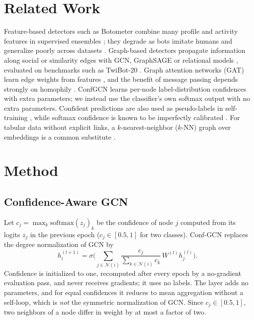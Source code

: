 \documentclass[conference,a4paper]{IEEEtran}
\begin{document}
\section{Related Work}
Feature-based detectors such as Botometer combine many profile and activity features in supervised ensembles \cite{davis2016botornot}; they degrade as bots imitate humans and generalize poorly across datasets \cite{yang2020scalable,lee2021discriminative}. Graph-based detectors propagate information along social or similarity edges with GCN, GraphSAGE \cite{hamilton2017sage} or relational models \cite{feng2021botrgcn,feng2022rgt}, evaluated on benchmarks such as TwiBot-20 \cite{feng2021twibot20}. Graph attention networks (GAT) learn edge weights from features \cite{velickovic2018gat}, and the benefit of message passing depends strongly on homophily \cite{zhu2020beyond}. ConfGCN \cite{vashishth2019confgcn} learns per-node label-distribution confidences with extra parameters; we instead use the classifier's own softmax output with no extra parameters. Confident predictions are also used as pseudo-labels in self-training \cite{lee2013pseudo,li2018deeper}, while softmax confidence is known to be imperfectly calibrated \cite{guo2017calibration}. For tabular data without explicit links, a $k$-nearest-neighbor ($k$-NN) graph over embeddings \cite{reimers2019sbert} is a common substitute \cite{zhu2003semi}.

\section{Method}

\subsection{Confidence-Aware GCN}
Let $c_j=\max_k \mathrm{softmax}(z_j)_k$ be the confidence of node $j$ computed from its logits $z_j$ in the previous epoch ($c_j\in[0.5,1]$ for two classes). Conf-GCN replaces the degree normalization of GCN by
\begin{equation}
h_i^{(l+1)}=\sigma\Big(\sum_{j\in\mathcal{N}(i)}\frac{c_j}{\sum_{k\in\mathcal{N}(i)}c_k}\,W^{(l)}h_j^{(l)}\Big).
\label{eq:conf}
\end{equation}
Confidence is initialized to one, recomputed after every epoch by a no-gradient evaluation pass, and never receives gradients; it uses no labels. The layer adds no parameters, and for equal confidences it reduces to mean aggregation without a self-loop, which is \emph{not} the symmetric normalization of GCN. Since $c_j\in[0.5,1]$, two neighbors of a node differ in weight by at most a factor of two.
\end{document}
